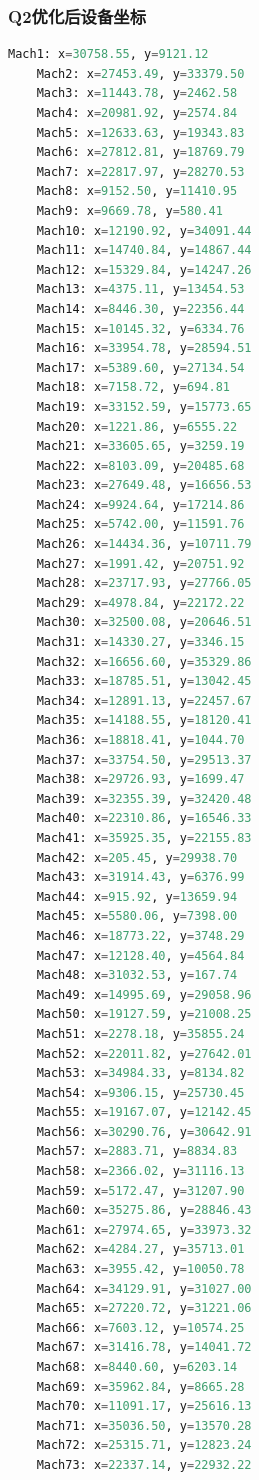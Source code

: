 \documentclass[12pt,a4paper]{article}
\begin{document}
\subsubsection{Q2优化后设备坐标}
\begin{lstlisting}[language=Python,basicstyle=\ttfamily\scriptsize,breaklines=true,frame=single]
	Mach1: x=30758.55, y=9121.12
	Mach2: x=27453.49, y=33379.50
	Mach3: x=11443.78, y=2462.58
	Mach4: x=20981.92, y=2574.84
	Mach5: x=12633.63, y=19343.83
	Mach6: x=27812.81, y=18769.79
	Mach7: x=22817.97, y=28270.53
	Mach8: x=9152.50, y=11410.95
	Mach9: x=9669.78, y=580.41
	Mach10: x=12190.92, y=34091.44
	Mach11: x=14740.84, y=14867.44
	Mach12: x=15329.84, y=14247.26
	Mach13: x=4375.11, y=13454.53
	Mach14: x=8446.30, y=22356.44
	Mach15: x=10145.32, y=6334.76
	Mach16: x=33954.78, y=28594.51
	Mach17: x=5389.60, y=27134.54
	Mach18: x=7158.72, y=694.81
	Mach19: x=33152.59, y=15773.65
	Mach20: x=1221.86, y=6555.22
	Mach21: x=33605.65, y=3259.19
	Mach22: x=8103.09, y=20485.68
	Mach23: x=27649.48, y=16656.53
	Mach24: x=9924.64, y=17214.86
	Mach25: x=5742.00, y=11591.76
	Mach26: x=14434.36, y=10711.79
	Mach27: x=1991.42, y=20751.92
	Mach28: x=23717.93, y=27766.05
	Mach29: x=4978.84, y=22172.22
	Mach30: x=32500.08, y=20646.51
	Mach31: x=14330.27, y=3346.15
	Mach32: x=16656.60, y=35329.86
	Mach33: x=18785.51, y=13042.45
	Mach34: x=12891.13, y=22457.67
	Mach35: x=14188.55, y=18120.41
	Mach36: x=18818.41, y=1044.70
	Mach37: x=33754.50, y=29513.37
	Mach38: x=29726.93, y=1699.47
	Mach39: x=32355.39, y=32420.48
	Mach40: x=22310.86, y=16546.33
	Mach41: x=35925.35, y=22155.83
	Mach42: x=205.45, y=29938.70
	Mach43: x=31914.43, y=6376.99
	Mach44: x=915.92, y=13659.94
	Mach45: x=5580.06, y=7398.00
	Mach46: x=18773.22, y=3748.29
	Mach47: x=12128.40, y=4564.84
	Mach48: x=31032.53, y=167.74
	Mach49: x=14995.69, y=29058.96
	Mach50: x=19127.59, y=21008.25
	Mach51: x=2278.18, y=35855.24
	Mach52: x=22011.82, y=27642.01
	Mach53: x=34984.33, y=8134.82
	Mach54: x=9306.15, y=25730.45
	Mach55: x=19167.07, y=12142.45
	Mach56: x=30290.76, y=30642.91
	Mach57: x=2883.71, y=8834.83
	Mach58: x=2366.02, y=31116.13
	Mach59: x=5172.47, y=31207.90
	Mach60: x=35275.86, y=28846.43
	Mach61: x=27974.65, y=33973.32
	Mach62: x=4284.27, y=35713.01
	Mach63: x=3955.42, y=10050.78
	Mach64: x=34129.91, y=31027.00
	Mach65: x=27220.72, y=31221.06
	Mach66: x=7603.12, y=10574.25
	Mach67: x=31416.78, y=14041.72
	Mach68: x=8440.60, y=6203.14
	Mach69: x=35962.84, y=8665.28
	Mach70: x=11091.17, y=25616.13
	Mach71: x=35036.50, y=13570.28
	Mach72: x=25315.71, y=12823.24
	Mach73: x=22337.14, y=22932.22

\end{lstlisting}
\end{document}
